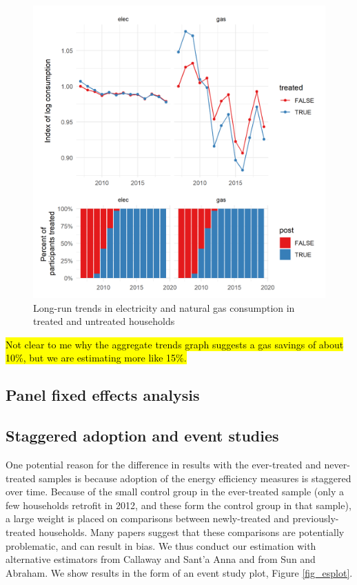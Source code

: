 \documentclass{article}
\newcommand{\hlc}[2][yellow]{ {\sethlcolor{#1} \hl{#2}} }
\begin{document}
\begin{figure}
	\includegraphics{../output_figures_tables/aggregate_trend_graph}
	\caption{Long-run trends in electricity and natural gas consumption in treated and untreated households}\label{fig_agg}
\end{figure}

\hlc{Not clear to me why the aggregate trends graph suggests a gas savings of about 10\%, but we are estimating more like 15\%.}

\subsection{Panel fixed effects analysis}


\subsection{Staggered adoption and event studies}
One potential reason for the difference in results with the ever-treated and never-treated samples is because adoption of the energy efficiency measures is staggered over time. Because of the small control group in the ever-treated sample (only a few households retrofit in 2012, and these form the control group in that sample), a large weight is placed on comparisons between newly-treated and previously-treated households. Many papers suggest that these comparisons are potentially problematic, and can result in bias.  We thus conduct our estimation with alternative estimators from Callaway and Sant'a Anna and from Sun and Abraham.  We show results in the form of an event study plot, Figure \ref{fig_esplot}.
\end{document}
